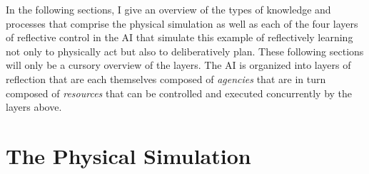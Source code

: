 In the following sections, I give an overview of the types of
knowledge and processes that comprise the physical simulation as well
as each of the four layers of reflective control in the AI that
simulate this example of reflectively learning not only to physically
act but also to deliberatively plan.  These following sections will
only be a cursory overview of the layers.  The AI is organized into
layers of reflection that are each themselves composed of
\emph{agencies} that are in turn composed of \emph{resources} that can
be controlled and executed concurrently by the layers above.

\section{The Physical Simulation}

